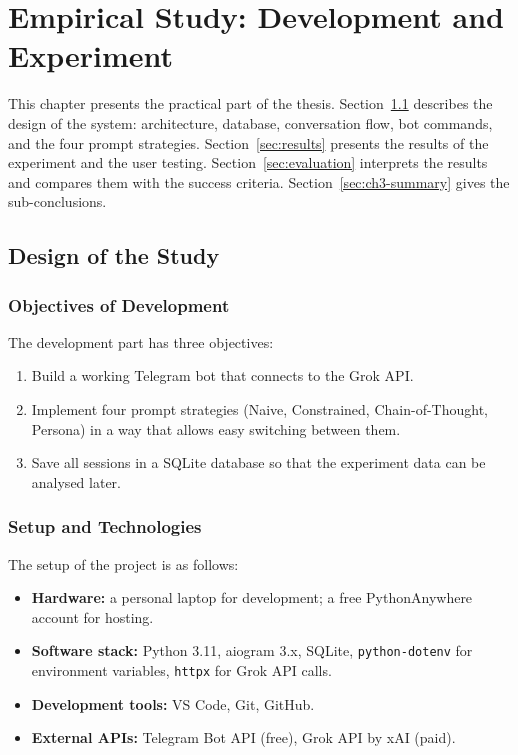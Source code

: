 \chapter{Empirical Study: Development and Experiment}
\label{ch:development}

This chapter presents the practical part of the thesis. Section~\ref{sec:design} describes the design of the system: architecture, database, conversation flow, bot commands, and the four prompt strategies. Section~\ref{sec:results} presents the results of the experiment and the user testing. Section~\ref{sec:evaluation} interprets the results and compares them with the success criteria. Section~\ref{sec:ch3-summary} gives the sub-conclusions.

\section{Design of the Study}
\label{sec:design}

\subsection{Objectives of Development}

The development part has three objectives:
\begin{enumerate}
    \item Build a working Telegram bot that connects to the Grok API.
    \item Implement four prompt strategies (Naive, Constrained, Chain-of-Thought, Persona) in a way that allows easy switching between them.
    \item Save all sessions in a SQLite database so that the experiment data can be analysed later.
\end{enumerate}

\subsection{Setup and Technologies}

The setup of the project is as follows:

\begin{itemize}
    \item \textbf{Hardware:} a personal laptop for development; a free PythonAnywhere account for hosting.
    \item \textbf{Software stack:} Python 3.11, aiogram 3.x, SQLite, \texttt{python-dotenv} for environment variables, \texttt{httpx} for Grok API calls.
    \item \textbf{Development tools:} VS Code, Git, GitHub.
    \item \textbf{External APIs:} Telegram Bot API (free), Grok API by xAI (paid).
\end{itemize}

